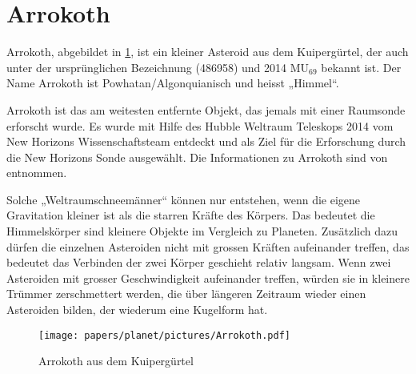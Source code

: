 %
%
%
%
\section{Arrokoth
\label{planet:section:arrokoth}}

Arrokoth, abgebildet in \cref{planet:fig:arrokoth}, ist ein kleiner Asteroid aus dem Kuipergürtel, der auch unter der ursprünglichen Bezeichnung (486958) und 2014 \(\text{MU}_{69}\) bekannt ist.
Der Name Arrokoth ist Powhatan/Algonquianisch und heisst „Himmel“.

Arrokoth ist das am weitesten entfernte Objekt, das jemals mit einer Raumsonde erforscht wurde.
Es wurde mit Hilfe des Hubble Weltraum Teleskops 2014 vom New Horizons Wissenschaftsteam entdeckt und als Ziel für die Erforschung durch die New Horizons Sonde ausgewählt.
Die Informationen zu Arrokoth sind von \cite{planet:arrokoth} entnommen.

Solche „Weltraumschneemänner“ können nur entstehen, wenn die eigene Gravitation kleiner ist als die starren Kräfte des Körpers.
Das bedeutet die Himmelskörper sind kleinere Objekte im Vergleich zu Planeten.
Zusätzlich dazu dürfen die einzelnen Asteroiden nicht mit grossen Kräften aufeinander treffen, das bedeutet das Verbinden der zwei Körper geschieht relativ langsam.
Wenn zwei Asteroiden mit grosser Geschwindigkeit aufeinander treffen, würden sie in kleinere Trümmer zerschmettert werden, die über längeren Zeitraum wieder einen Asteroiden bilden, der wiederum eine Kugelform hat.

\begin{figure}[h]
    \centering
    \texttt{[image: papers/planet/pictures/Arrokoth.pdf]}
    \caption{Arrokoth aus dem Kuipergürtel \cite{planet:arrokothpic}
        \label{planet:fig:arrokoth}}
\end{figure}